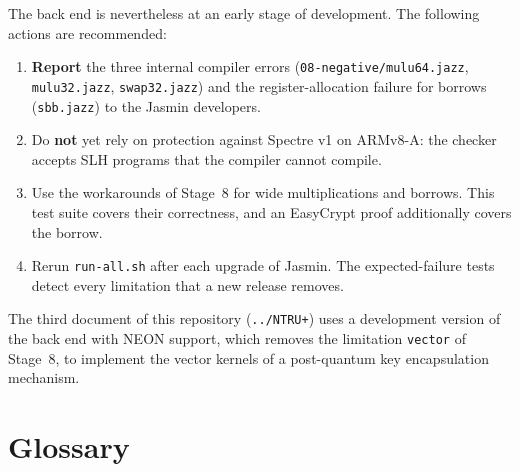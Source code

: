\documentclass[11pt,a4paper]{article}
\newcommand{\file}[1]{\texttt{#1}}
\begin{document}
The back end is nevertheless at an early stage of development. The following
actions are recommended:
\begin{enumerate}[leftmargin=*,itemsep=1pt]
  \item \textbf{Report} the three internal compiler errors
        (\file{08-negative/mulu64.jazz}, \file{mulu32.jazz},
        \file{swap32.jazz}) and the register-allocation failure for borrows
        (\file{sbb.jazz}) to the Jasmin developers.
  \item Do \textbf{not} yet rely on protection against Spectre v1 on
        ARMv8-A: the checker accepts SLH programs that the compiler cannot
        compile.
  \item Use the workarounds of Stage~8 for wide multiplications and
        borrows. This test suite covers their correctness, and an EasyCrypt
        proof additionally covers the borrow.
  \item Rerun \file{run-all.sh} after each upgrade of Jasmin. The
        expected-failure tests detect every limitation that a new release
        removes.
\end{enumerate}

The third document of this repository (\file{../NTRU+}) uses a development
version of the back end with NEON support, which removes the limitation
\texttt{vector} of Stage~8, to implement the vector kernels of a
post-quantum key encapsulation mechanism.

\appendix
\section{Glossary}
\label{app:glossary}
\end{document}
